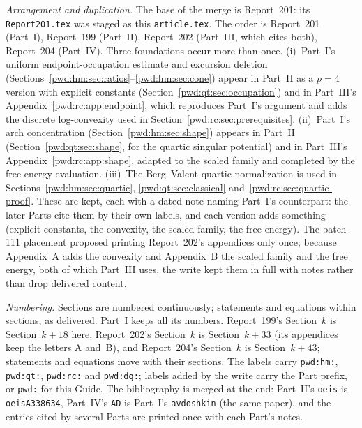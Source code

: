 \documentclass[11pt,letterpaper]{article}
\numberwithin{equation}{section}
\theoremstyle{remark}\newtheorem{remark}[theorem]{Remark}
\newcommand{\file}[1]{\nolinkurl{#1}}
\begin{document}
\emph{Arrangement and duplication.} The base of the merge is Report~201: its
\file{Report201.tex} was staged as this \file{article.tex}. The order is
Report~201 (Part~I), Report~199 (Part~II), Report~202 (Part~III, which cites
both), Report~204 (Part~IV). Three foundations occur more than once.
(i)~Part~I's uniform endpoint-occupation estimate and excursion deletion
(Sections~\ref{pwd:hm:sec:ratios}--\ref{pwd:hm:sec:cone}) appear in Part~II
as a $p=4$ version with explicit constants
(Section~\ref{pwd:qt:sec:occupation}) and in Part~III's
Appendix~\ref{pwd:rc:app:endpoint}, which reproduces Part~I's argument and
adds the discrete log-convexity used in Section~\ref{pwd:rc:sec:prerequisites}.
(ii)~Part~I's arch concentration (Section~\ref{pwd:hm:sec:shape}) appears in
Part~II (Section~\ref{pwd:qt:sec:shape}, for the quartic singular potential)
and in Part~III's Appendix~\ref{pwd:rc:app:shape}, adapted to the scaled
family and completed by the free-energy evaluation. (iii)~The Berg--Valent
quartic normalization is used in Sections~\ref{pwd:hm:sec:quartic},
\ref{pwd:qt:sec:classical} and~\ref{pwd:rc:sec:quartic-proof}. These are kept,
each with a dated note naming Part~I's counterpart: the later Parts cite them
by their own labels, and each version adds something (explicit constants, the
convexity, the scaled family, the free energy). The batch-111 placement
proposed printing Report~202's appendices only once; because Appendix~A adds
the convexity and Appendix~B the scaled family and the free energy, both of
which Part~III uses, the write kept them in full with notes rather than drop
delivered content.

\emph{Numbering.} Sections are numbered continuously; statements and
equations within sections, as delivered. Part~I keeps all its numbers.
Report~199's Section~$k$ is Section~$k+18$ here, Report~202's Section~$k$ is
Section~$k+33$ (its appendices keep the letters A and~B), and Report~204's
Section~$k$ is Section~$k+43$; statements and equations move with their
sections. The labels carry \file{pwd:hm:}, \file{pwd:qt:}, \file{pwd:rc:} and
\file{pwd:dg:}; labels added by the write carry the Part prefix, or
\file{pwd:} for this Guide. The bibliography is merged at the end: Part~II's
\file{oeis} is \file{oeisA338634}, Part~IV's \file{AD} is Part~I's
\file{avdoshkin} (the same paper), and the entries cited by several Parts
are printed once with each Part's notes.
\end{document}
